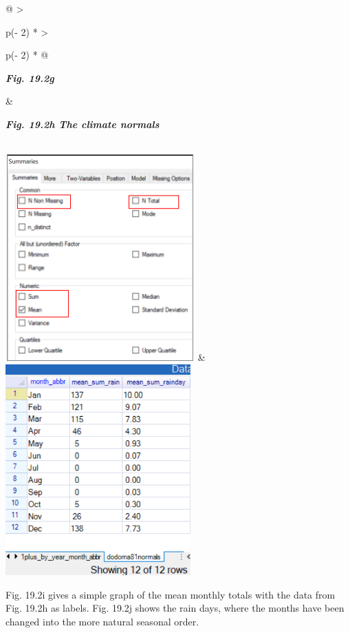 \documentclass[
  letterpaper,
  DIV=11,
  numbers=noendperiod]{scrreprt}
\begin{document}
\begin{longtable}[]{@{}
  >{\raggedright\arraybackslash}p{(\columnwidth - 2\tabcolsep) * }
  >{\raggedright\arraybackslash}p{(\columnwidth - 2\tabcolsep) * }@{}}
\toprule\noalign{}
\begin{minipage}[b]{\linewidth}\raggedright
\textbf{\emph{Fig. 19.2g}}
\end{minipage} & \begin{minipage}[b]{\linewidth}\raggedright
\textbf{\emph{Fig. 19.2h The climate normals}}
\end{minipage} \\
\midrule\noalign{}
\endhead
\bottomrule\noalign{}
\endlastfoot
\includegraphics[width=2.86638in,height=3.12462in]{figures/Fig19.2g.png}
&
\includegraphics[width=2.80561in,height=3.19153in]{figures/Fig19.2h.png} \\
\end{longtable}

Fig. 19.2i gives a simple graph of the mean monthly totals with the data
from Fig. 19.2h as labels. Fig. 19.2j shows the rain days, where the
months have been changed into the more natural seasonal order.
\end{document}
